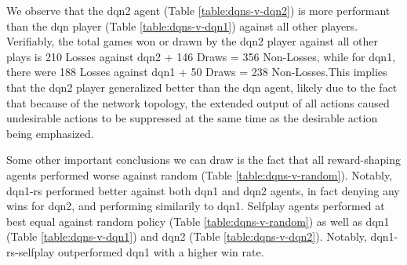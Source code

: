 \documentclass[../report.tex]{subfiles}
\begin{document}
We observe that the dqn2 agent (Table \ref{table:dqns-v-dqn2}) is more performant than the dqn player (Table \ref{table:dqns-v-dqn1}) against all other players. Verifiably, the total games won or drawn by the dqn2 player against all other plays is 210 Losses against dqn2 + 146 Draws = 356 Non-Losses, while for dqn1, there were 188 Losses against dqn1 + 50 Draws =  238 Non-Losses.This implies that the dqn2 player generalized better than the dqn agent, likely due to the fact that because of the network topology, the extended output of all actions caused undesirable actions to be suppressed at the same time as the desirable action being emphasized. 

Some other important conclusions we can draw is the fact that all reward-shaping agents performed worse against random (Table \ref{table:dqns-v-random}). Notably, dqn1-rs performed better against both dqn1 and dqn2 agents, in fact denying any wins for dqn2, and performing similarily to dqn1. Selfplay agents performed at best equal against random policy (Table \ref{table:dqns-v-random}) as well as dqn1 (Table \ref{table:dqns-v-dqn1}) and dqn2 (Table \ref{table:dqns-v-dqn2}). Notably, dqn1-rs-selfplay outperformed dqn1 with a higher win rate.
\end{document}
